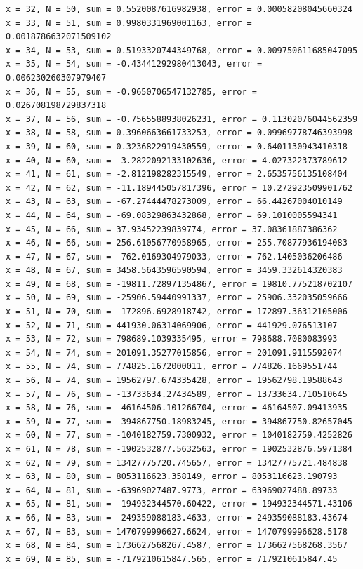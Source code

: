 \documentclass{article}
\begin{document}
\begin{lstlisting}
x = 32, N = 50, sum = 0.5520087616982938, error = 0.00058208045660324
x = 33, N = 51, sum = 0.9980331969001163, error = 0.0018786632071509102
x = 34, N = 53, sum = 0.5193320744349768, error = 0.009750611685047095
x = 35, N = 54, sum = -0.43441292980413043, error = 0.006230260307979407
x = 36, N = 55, sum = -0.9650706547132785, error = 0.026708198729837318
x = 37, N = 56, sum = -0.7565588938026231, error = 0.11302076044562359
x = 38, N = 58, sum = 0.3960663661733253, error = 0.09969778746393998
x = 39, N = 60, sum = 0.3236822919430559, error = 0.6401130943410318
x = 40, N = 60, sum = -3.2822092133102636, error = 4.027322373789612
x = 41, N = 61, sum = -2.812198282315549, error = 2.6535756135108404
x = 42, N = 62, sum = -11.189445057817396, error = 10.272923509901762
x = 43, N = 63, sum = -67.27444478273009, error = 66.44267004010149
x = 44, N = 64, sum = -69.08329863432868, error = 69.1010005594341
x = 45, N = 66, sum = 37.93452239839774, error = 37.08361887386362
x = 46, N = 66, sum = 256.61056770958965, error = 255.70877936194083
x = 47, N = 67, sum = -762.0169304979033, error = 762.1405036206486
x = 48, N = 67, sum = 3458.5643596590594, error = 3459.332614320383
x = 49, N = 68, sum = -19811.728971354867, error = 19810.775218702107
x = 50, N = 69, sum = -25906.59440991337, error = 25906.332035059666
x = 51, N = 70, sum = -172896.6928918742, error = 172897.36312105006
x = 52, N = 71, sum = 441930.06314069906, error = 441929.076513107
x = 53, N = 72, sum = 798689.1039335495, error = 798688.7080083993
x = 54, N = 74, sum = 201091.35277015856, error = 201091.9115592074
x = 55, N = 74, sum = 774825.1672000011, error = 774826.1669551744
x = 56, N = 74, sum = 19562797.674335428, error = 19562798.19588643
x = 57, N = 76, sum = -13733634.27434589, error = 13733634.710510645
x = 58, N = 76, sum = -46164506.101266704, error = 46164507.09413935
x = 59, N = 77, sum = -394867750.18983245, error = 394867750.82657045
x = 60, N = 77, sum = -1040182759.7300932, error = 1040182759.4252826
x = 61, N = 78, sum = -1902532877.5632563, error = 1902532876.5971384
x = 62, N = 79, sum = 13427775720.745657, error = 13427775721.484838
x = 63, N = 80, sum = 8053116623.358149, error = 8053116623.190793
x = 64, N = 81, sum = -63969027487.9773, error = 63969027488.89733
x = 65, N = 81, sum = -194932344570.60422, error = 194932344571.43106
x = 66, N = 83, sum = -249359088183.4633, error = 249359088183.43674
x = 67, N = 83, sum = 1470799996627.6624, error = 1470799996628.5178
x = 68, N = 84, sum = 1736627568267.4587, error = 1736627568268.3567
x = 69, N = 85, sum = -7179210615847.565, error = 7179210615847.45

\end{lstlisting}
\end{document}
